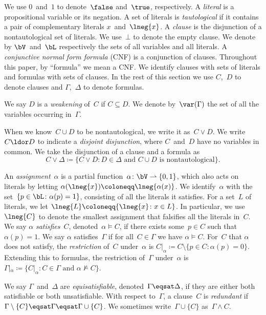 \documentclass[12pt]{article}
\begin{document}
We use $0$~and~$1$ to denote~$\false$ and~$\true$, respectively.
A \emph{literal} is a propositional variable or its negation.
A set of literals is \emph{tautological}
if it contains a pair of complementary literals $x$~and~$\lneg{x}$.
A \emph{clause} is the disjunction of a nontautological set of literals.
We use~$\bot$ to denote the empty clause.
We denote by $\bV$~and~$\bL$ respectively
the sets of all variables and all literals.
A \emph{conjunctive normal form formula} (CNF) is a conjunction of clauses.
Throughout this paper, by ``formula'' we mean a CNF\@.
We identify clauses with sets of literals and formulas with sets of clauses.
In the rest of this section we use $C$,~$D$ to denote clauses
and $\Gamma$,~$\Delta$ to denote formulas.

We say $D$ is a \emph{weakening} of~$C$ if $C \subseteq D$.
We denote by~$\var(\Gamma)$ the set of all the variables occurring in~$\Gamma$.

When we know~$C \cup D$ to be nontautological, we write it as~$C \lor D$.
We write~$C \ldor D$ to indicate a \emph{disjoint disjunction},
where $C$~and~$D$ have no variables in common.
We take the disjunction of a clause and a formula as
\begin{equation*}
  C \lor \Delta \coloneqq \{C \lor D \colon
  D \in \Delta \text{ and } C \cup D \text{ is nontautological}\}.
\end{equation*}

An \emph{assignment}~$\alpha$
is a partial function~$\alpha \colon \bV \rightharpoonup \{0,1\}$,
which also acts on literals by letting $\alpha(\lneg{x}) \coloneqq \lneg{\alpha(x)}$.
We identify~$\alpha$ with the set~$\{p \in \bL \colon \alpha(p) = 1\}$,
consisting of all the literals it satisfies.
For a set~$L$ of literals, we let $\lneg{L} \coloneqq \{\lneg{x} \colon x \in L\}$.
In particular, we use~$\lneg{C}$ to denote the smallest assignment
that falsifies all the literals in~$C$.
We say $\alpha$ \emph{satisfies}~$C$, denoted~$\alpha \models C$,
if there exists some~$p \in C$ such that $\alpha(p) = 1$.
We say $\alpha$ satisfies~$\Gamma$ if for all~$C \in \Gamma$ we have $\alpha \models C$.
For~$C$ that $\alpha$ does not satisfy,
the \emph{restriction} of~$C$ under~$\alpha$ is
$C|_\alpha \coloneqq C \setminus \{p \in C \colon \alpha(p) = 0\}$.
Extending this to formulas, the restriction of~$\Gamma$ under~$\alpha$ is
$\Gamma|_\alpha \coloneqq \{C|_\alpha
\colon C \in \Gamma \text{ and } \alpha \not\models C\}$.

We say $\Gamma$~and~$\Delta$ are \emph{equisatisfiable}, denoted~$\Gamma \eqsat \Delta$,
if they are either both satisfiable or both unsatisfiable.
With respect to~$\Gamma$, a clause~$C$ is \emph{redundant}
if $\Gamma \setminus \{C\} \eqsat \Gamma \eqsat \Gamma \cup \{C\}$.
We sometimes write~$\Gamma \cup \{C\}$ as~$\Gamma \land C$.
\end{document}
